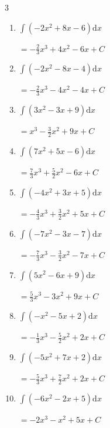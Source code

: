 \begin{multicols}{3}
\begin{enumerate}
        $\displaystyle =-3x^{3}-\frac{3}{2}x^{2}+2x+ C$

  \item $\displaystyle \int \left( -2x^{2}+8x-6 \right) \mathrm{d}x$

        $\displaystyle =-\frac{2}{3}x^{3}+4x^{2}-6x+ C$

  \item $\displaystyle \int \left( -2x^{2}-8x-4 \right) \mathrm{d}x$

        $\displaystyle =-\frac{2}{3}x^{3}-4x^{2}-4x+ C$

  \item $\displaystyle \int \left( 3x^{2}-3x+9 \right) \mathrm{d}x$

        $\displaystyle =x^{3}-\frac{3}{2}x^{2}+9x+ C$

  \item $\displaystyle \int \left( 7x^{2}+5x-6 \right) \mathrm{d}x$

        $\displaystyle =\frac{7}{3}x^{3}+\frac{5}{2}x^{2}-6x+ C$

  \item $\displaystyle \int \left( -4x^{2}+3x+5 \right) \mathrm{d}x$

        $\displaystyle =-\frac{4}{3}x^{3}+\frac{3}{2}x^{2}+5x+ C$

  \item $\displaystyle \int \left( -7x^{2}-3x-7 \right) \mathrm{d}x$

        $\displaystyle =-\frac{7}{3}x^{3}-\frac{3}{2}x^{2}-7x+ C$

\columnbreak %

  \item $\displaystyle \int \left( 5x^{2}-6x+9 \right) \mathrm{d}x$

        $\displaystyle =\frac{5}{3}x^{3}-3x^{2}+9x+ C$

  \item $\displaystyle \int \left( -x^{2}-5x+2 \right) \mathrm{d}x$

        $\displaystyle =-\frac{1}{3}x^{3}-\frac{5}{2}x^{2}+2x+ C$

  \item $\displaystyle \int \left( -5x^{2}+7x+2 \right) \mathrm{d}x$

        $\displaystyle =-\frac{5}{3}x^{3}+\frac{7}{2}x^{2}+2x+ C$

  \item $\displaystyle \int \left( -6x^{2}-2x+5 \right) \mathrm{d}x$

        $\displaystyle =-2x^{3}-x^{2}+5x+ C$


\end{enumerate}
\end{multicols}
